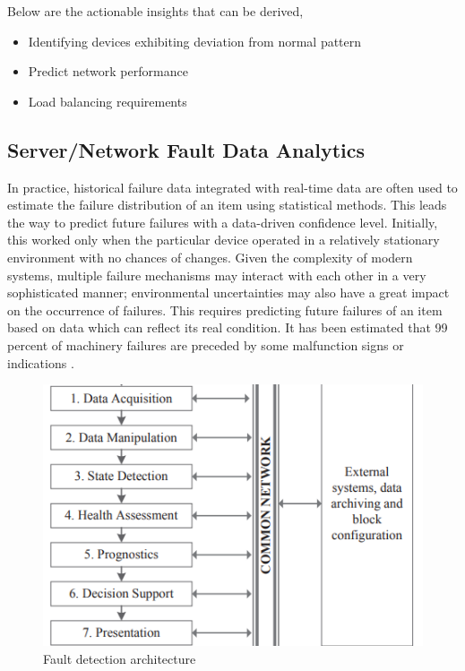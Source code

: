\documentclass[sigconf]{acmart}
\begin{document}
Below are the actionable insights that can be derived,

\begin{itemize}
\item Identifying devices exhibiting deviation from normal pattern
\item Predict network performance
\item Load balancing requirements
\end{itemize}


\subsection{Server/Network Fault Data Analytics}

In practice, historical failure data integrated with real-time data are often used to estimate the failure distribution of an item using statistical methods. This leads the way to predict future failures with a data-driven confidence level. Initially, this worked only when the particular device operated in a relatively stationary environment with no chances of changes. Given the complexity of modern systems, multiple failure mechanisms may interact with each other in a very sophisticated manner; environmental uncertainties may also have a great impact on the occurrence of failures. This requires predicting future failures of an item based on data which can reflect its real condition. It has been estimated that 99 percent of machinery failures are
preceded by some malfunction signs or indications \cite{big-data-analytics-for-fault-detection}. 

\begin{figure}[htb]
  \centering
  \includegraphics[width=1.0\columnwidth]{images/Figure4.png}
  \caption{Fault detection architecture 
  \cite{big-data-analytics-for-fault-detection}}
  \label{fig:Figure4} 
\end{figure}
\end{document}

